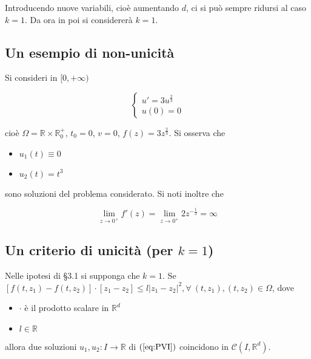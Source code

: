 \documentclass[hidelinks, 10pt]{report}
\begin{document}
Introducendo nuove variabili, cio\`e aumentando $ d $, ci si pu\`o sempre  ridursi al caso $ k = 1 $. Da ora in poi si considerer\`a $ k = 1 $.

\subsection{Un esempio di non-unicit\`a}
Si consideri in $ [0, +\infty) $

\[ \begin{cases}
u' = 3 u^{\frac{2}{3}} \\
u(0) = 0
\end{cases}
\]

cio\`e $ \Omega = \mathbb{R} \times \mathbb{R}^{+}_{0} $, $ t_{0} = 0 $, $ v = 0 $, $ f(z) = 3 z^{\frac{2}{3}} $. Si osserva che
\begin{itemize}
\item $ u_{1}(t) \equiv 0 $
\item $ u_{2}(t) = t^{3} $
\end{itemize}
sono soluzioni del problema considerato. Si noti inoltre che

\[ \lim\limits_{z \to 0^{+}} f'(z) = \lim\limits_{z \to 0^{+}} 2 z^{-\frac{1}{3}} = \infty \]

\subsection{Un criterio di unicit\`a (per $ k = 1 $)}
Nelle ipotesi di \S 3.1 si supponga che $ k = 1 $. Se $ [f(t, z_{1}) - f(t, z_{2})] \cdot [z_{1} - z_{2}] \le l \vert z_{1} - z_{2} \vert^{2}, \forall\ (t, z_{1}), (t, z_{2}) \in \Omega $, dove
\begin{itemize}
\item $ \cdot $ \`e il prodotto scalare in $ \mathbb{R}^{d} $
\item $ l \in \mathbb{R} $
\end{itemize}

allora due soluzioni $ u_{1}, u_{2}: I \to \mathbb{R} $ di $ (\ref{eq:PVI}) $ coincidono in $ \mathcal{C}(I, \mathbb{R}^{d}) $.
\end{document}
